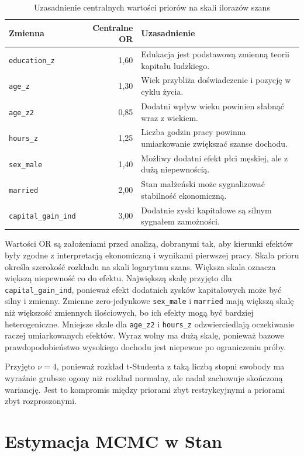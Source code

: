 \documentclass[12pt,a4paper]{article}
\begin{document}
\begin{table}[H]
\centering
\caption{Uzasadnienie centralnych wartości priorów na skali ilorazów szans}
\scriptsize
\begin{tabular}{lrl}
\toprule
Zmienna & Centralne OR & Uzasadnienie \\
\midrule
\texttt{education\_z} & 1{,}60 & Edukacja jest podstawową zmienną teorii kapitału ludzkiego. \\
\texttt{age\_z} & 1{,}30 & Wiek przybliża doświadczenie i pozycję w cyklu życia. \\
\texttt{age\_z2} & 0{,}85 & Dodatni wpływ wieku powinien słabnąć wraz z wiekiem. \\
\texttt{hours\_z} & 1{,}25 & Liczba godzin pracy powinna umiarkowanie zwiększać szanse dochodu. \\
\texttt{sex\_male} & 1{,}40 & Możliwy dodatni efekt płci męskiej, ale z dużą niepewnością. \\
\texttt{married} & 2{,}00 & Stan małżeński może sygnalizować stabilność ekonomiczną. \\
\texttt{capital\_gain\_ind} & 3{,}00 & Dodatnie zyski kapitałowe są silnym sygnałem zamożności. \\
\bottomrule
\end{tabular}
\end{table}

Wartości OR są założeniami przed analizą, dobranymi tak, aby kierunki efektów były zgodne z interpretacją
ekonomiczną i wynikami pierwszej pracy. Skala prioru określa szerokość rozkładu
na skali logarytmu szans. Większa skala oznacza większą niepewność co do efektu.
Największą skalę przyjęto dla \texttt{capital\_gain\_ind}, ponieważ efekt
dodatnich zysków kapitałowych może być silny i zmienny. Zmienne zero-jedynkowe
\texttt{sex\_male} i \texttt{married} mają większą skalę niż większość zmiennych
ilościowych, bo ich efekty mogą być bardziej heterogeniczne. Mniejsze skale dla
\texttt{age\_z2} i \texttt{hours\_z} odzwierciedlają oczekiwanie raczej
umiarkowanych efektów. Wyraz wolny ma dużą skalę, ponieważ bazowe
prawdopodobieństwo wysokiego dochodu jest niepewne po ograniczeniu próby.

Przyjęto \(\nu=4\), ponieważ rozkład t-Studenta z taką liczbą stopni swobody ma
wyraźnie grubsze ogony niż rozkład normalny, ale nadal zachowuje skończoną
wariancję. Jest to kompromis między priorami zbyt restrykcyjnymi a priorami
zbyt rozproszonymi.

\section{Estymacja MCMC w Stan}
\end{document}
